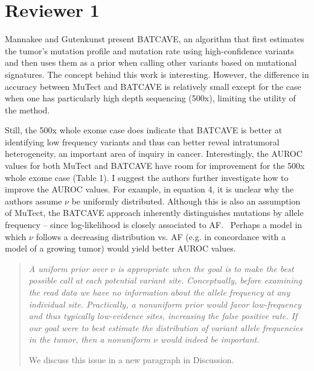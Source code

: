 \documentclass[11pt]{article}
\newenvironment{response}
{\begin{quote}\itshape}
{\end{quote}}
\begin{document}
\section*{Reviewer 1}

Mannakee and Gutenkunst present BATCAVE, an algorithm that first estimates the tumor’s mutation profile and mutation rate using high-confidence variants and then uses them as a prior when calling other variants based on mutational signatures. The concept behind this work is interesting. However, the difference in accuracy between MuTect and BATCAVE is relatively small except for the case when one has particularly high depth sequencing (500x), limiting the utility of the method. 

Still, the 500x whole exome case does indicate that BATCAVE is better at identifying low frequency variants and thus can better reveal intratumoral heterogeneity, an important area of inquiry in cancer. Interestingly, the AUROC values for both MuTect and BATCAVE have room for improvement for the 500x whole exome case (Table 1). I suggest the authors further investigate how to improve the AUROC values. For example, in equation 4, it is unclear why the authors assume $\nu$ be uniformly distributed. Although this is also an assumption of MuTect, the BATCAVE approach inherently distinguishes mutations by allele frequency – since log-likelihood is closely associated to AF.  Perhaps a model in which $\nu$ follows a decreasing distribution vs. AF (e.g. in concordance with a model of a growing tumor) would yield better AUROC values.  
\begin{response}
A uniform prior over $\nu$ is appropriate when the goal is to make the best possible call at each potential variant site.
Conceptually, before examining the read data we have no information about the allele frequency at any individual site.
Practically, a nonuniform prior would favor low-frequency and thus typically low-evidence sites, increasing the false positive rate.
If our goal were to best estimate the distribution of variant allele frequencies in the tumor, then a nonuniform $\nu$ would indeed be important.

We discuss this issue in a new paragraph in Discussion.
\end{response}
\end{document}
